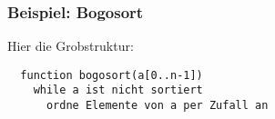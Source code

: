 \begin{frame}[fragile]
\frametitle{Beispiel: Bogosort}
Hier die Grobstruktur:
\begin{lstlisting}
  function bogosort(a[0..n-1])
    while a ist nicht sortiert
      ordne Elemente von a per Zufall an
\end{lstlisting}%
\end{frame} 
